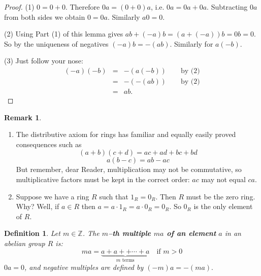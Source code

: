 \documentclass[11pt]{amsbook}
\newtheorem{definition}[theorem]{Definition}
\theoremstyle{definition}
\newtheorem{rem}[theorem]{Remark}
\begin{document}
\begin{proof} (1) $0 = 0 + 0$. Therefore $0a = (0 + 0)a$, i.e. $0a = 0a + 0a$. Subtracting $0a$ from both sides we obtain $0 = 0a$. Similarly $a0 = 0$.

(2) Using Part (1) of this lemma gives $ab + (-a)b = (a + (-a))b = 0b = 0$. So by the uniqueness of negatives $(-a)b = -(ab)$. Similarly for $a(-b)$.

(3) Just follow your nose: \begin{eqnarray*} (-a)(-b) & = & -(a(-b)) \qquad \text{by (2)} \\ & = & - ( - (ab)) \qquad \text{by (2)} \\ & = &ab. \end{eqnarray*}
\end{proof}
\begin{rem}
\begin{enumerate}
\item
The distributive axiom for rings has familiar and equally easily proved consequences such as $$(a+b)(c+d) = ac + ad +bc +bd$$ $$a(b-c) = ab - ac$$ But remember, dear Reader, multiplication may not be commutative, so multiplicative factors must be kept in the correct order: $ac$ may not equal $ca$.
\item
Suppose we have a ring $R$ such that $1_R = 0_R$. Then $R$ must be the zero ring. Why? Well, if $a\in R$ then $a = a\cdot 1_R = a\cdot 0_R = 0_R$. So $0_R$ is the only element of $R$.
\end{enumerate}
\end{rem}
\begin{definition} \label{multiples}
Let $m\in \mathbb{Z}$. The {\bf $m$--th multiple $ma$ of an element}
$a$ in an abelian group $R$ is:
\begin{equation*}
ma  = \underbrace{a+ a+ + \cdots + a}_{\text{$m$ terms}} \quad \text{if $m>0$}
\end{equation*} $0a =0$, and negative multiples are defined by $(-m)a =  - (ma).$
\end{definition}
\end{document}
